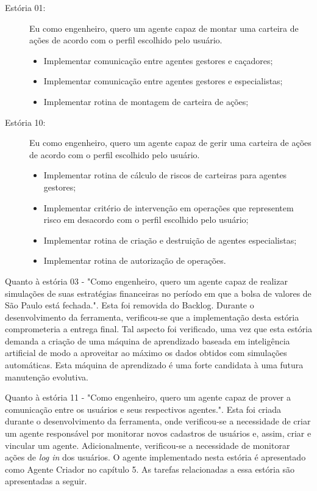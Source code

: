 \begin{description}
\item[Estória 01:]
Eu como engenheiro, quero um agente capaz de montar uma carteira de ações de acordo com o perfil escolhido pelo usuário.

\begin{itemize}
		\item Implementar comunicação entre agentes gestores e caçadores;
		\item Implementar comunicação entre agentes gestores e especialistas;
		\item Implementar rotina de montagem de carteira de ações;
		

\end{itemize}

\item[Estória 10:]
Eu como engenheiro, quero um agente capaz de gerir uma carteira de ações de acordo com o perfil escolhido pelo usuário.
\begin{itemize}

	\item Implementar rotina de cálculo de riscos de carteiras para agentes gestores;
	\item Implementar critério de intervenção em operações que representem risco em desacordo com o perfil escolhido pelo usuário;
	\item Implementar rotina de criação e destruição de agentes especialistas;
	\item Implementar rotina de autorização de operações.

\end{itemize}
\end{description}

Quanto à estória 03 - "Como engenheiro, quero um agente capaz de realizar simulações de suas estratégias financeiras no período em que a bolsa de valores de São Paulo está fechada.". Esta foi removida do Backlog. Durante o desenvolvimento da ferramenta, verificou-se que a implementação desta estória comprometeria a entrega final. Tal aspecto foi verificado, uma vez que esta estória demanda a criação de uma máquina de aprendizado baseada em inteligência artificial de modo a aproveitar ao máximo os dados obtidos com simulações automáticas. Esta máquina de aprendizado é uma forte candidata à uma futura manutenção evolutiva.

Quanto à estória 11 - "Como engenheiro, quero um agente capaz de prover a comunicação entre os usuários e seus respectivos agentes.". Esta foi criada durante o desenvolvimento da ferramenta, onde verificou-se a necessidade de criar um agente responsável por monitorar novos cadastros de usuários e, assim, criar e vincular um agente. Adicionalmente, verificou-se a necessidade de monitorar ações de \textit{log in} dos usuários. O agente implementado nesta estória é apresentado como Agente Criador no capítulo 5. As tarefas relacionadas a essa estória são apresentadas a seguir.


